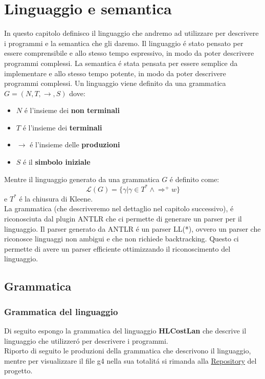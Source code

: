 \documentclass[../../main.tex]{subfiles}
\begin{document}
\chapter{Linguaggio e semantica}

In questo capitolo definisco il linguaggio che andremo ad utilizzare per descrivere i programmi e la semantica che gli daremo. Il linguaggio é stato pensato per essere comprensibile e allo stesso tempo espressivo, in modo da poter descrivere programmi complessi. La semantica é stata pensata per essere semplice da implementare e allo stesso tempo potente, in modo da poter descrivere programmi complessi.
Un linguaggio viene definito da una grammatica $G = (N, T ,\rightarrow, S)$ dove:
\begin{itemize}
    \item $N$ é l'insieme dei \textbf{non terminali}
    \item $T$ é l'insieme dei \textbf{terminali}
    \item $\rightarrow$ é l'insieme delle \textbf{produzioni}
    \item $S$ é il \textbf{simbolo iniziale}
\end{itemize}

Mentre il linguaggio generato da una grammatica $G$ é definito come:
\begin{equation}
    \mathcal{L}(G) = \{\gamma | \gamma \in T^* \land \Rightarrow^+ w\}
\end{equation}
e $T^*$ é la chiusura di Kleene.\\
La grammatica (che descriveremo nel dettaglio nel capitolo successivo), é riconosciuta dal plugin ANTLR che ci permette di generare un parser per il linguaggio. Il parser generato da ANTLR é un parser LL(*), ovvero un parser che riconosce linguaggi non ambigui e che non richiede backtracking. Questo ci permette di avere un parser efficiente ottimizzando il riconoscimento del linguaggio.

\section{Grammatica}

\subsection{Grammatica del linguaggio}
Di seguito espongo la grammatica del linguaggio \textbf{HLCostLan} che descrive il linguaggio che utilizzeró per descrivere i programmi.\\
Riporto di seguito le produzioni della grammatica che descrivono il linguaggio, mentre per visualizzare il file g4 nella sua totalitá si rimanda alla \href{https://github.com/minosse99/CostCompiler/blob/master/src/HLCostLan.g4}{Repository} del progetto.\\
\label{sec:grammatica}
\end{document}
